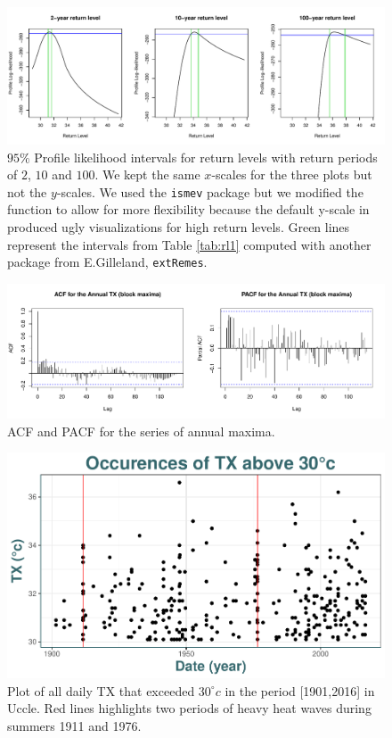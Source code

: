 \begin{figure}[!htb]
	\centering	\includegraphics[width=.95\linewidth]{proflikrl.pdf}\caption{ $95\%$ Profile likelihood intervals for return levels with return periods of $2$, $10$ and $100$. We kept the same $x$-scales for the three plots but not the $y$-scales. We used the \texttt{ismev} package but we modified the function to allow for more flexibility because the default y-scale in produced ugly visualizations for high return levels. Green lines represent the intervals from Table \ref{tab:rl1} computed with another package from E.Gilleland, \texttt{extRemes}. }\label{fig:proflikrl}
\end{figure}


\begin{figure}[!htb]
	\centering	\includegraphics[width=.95\linewidth]{acf_gev.pdf}\caption{ACF and PACF for the series of annual maxima.}\label{fig:acf_gev}
\end{figure}




\begin{figure}[!htb]
\centering\includegraphics[width=0.7\linewidth]{abo.pdf}
\caption{Plot of all daily TX that exceeded $30^{\circ}c$ in the period [1901,2016] in Uccle. Red lines highlights two periods of heavy heat waves during summers 1911 and 1976.}\label{fig:abo}
\end{figure}


